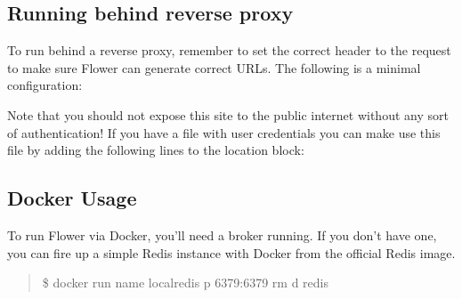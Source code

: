 \documentclass[letterpaper,10pt,english]{sphinxmanual}
\begin{document}
\subsection{Running behind reverse proxy}
\label{\detokenize{reverse-proxy:running-behind-reverse-proxy}}\label{\detokenize{reverse-proxy:reverse-proxy}}\label{\detokenize{reverse-proxy::doc}}
To run  behind a reverse proxy, remember to set the correct 
header to the request to make sure Flower can generate correct URLs.
The following is a minimal  configuration:

\begin{sphinxVerbatim}[commandchars=\\\{\}]
 
     
     
     

      
         
          
         
         
          
          
\end{sphinxVerbatim}

Note that you should not expose this site to the public internet without
any sort of authentication! If you have a  file with user
credentials you can make  use this file by adding the following
lines to the location block:

\begin{sphinxVerbatim}[commandchars=\\\{\}]
 
 
\end{sphinxVerbatim}


\subsection{Docker Usage}
\label{\detokenize{docker:docker-usage}}\label{\detokenize{docker::doc}}
To run Flower via Docker, you’ll need a broker running.  If you don’t
have one, you can fire up a simple Redis instance with Docker from the
official Redis image.
\begin{quote}

\$ docker run \textendash{}name localredis \sphinxhyphen{}p 6379:6379 \textendash{}rm \sphinxhyphen{}d redis
\end{quote}
\end{document}
